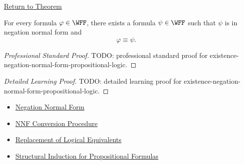 \newpage
{}
\label{prf:existence-negation-normal-form-propositional-logic}

\begin{remark*}[Return]
\hyperref[thm:existence-negation-normal-form-propositional-logic]{Return to Theorem}
\end{remark*}

\begin{theorem*}
For every formula \(\varphi\in\WFF\), there exists a formula \(\psi\in\WFF\)
such that \(\psi\) is in negation normal form and
\[
\varphi\equiv\psi.
\]
\end{theorem*}

\begin{proof}[Professional Standard Proof]
\LRAProofBodyStart
TODO: professional standard proof for existence-negation-normal-form-propositional-logic.
\end{proof}

\begin{proof}[Detailed Learning Proof]
\LRAProofBodyStart
TODO: detailed learning proof for existence-negation-normal-form-propositional-logic.
\end{proof}

\begin{remark*}
\end{remark*}

\begin{dependencies}
\begin{itemize}
  \item \hyperref[def:negation-normal-form-propositional-logic]{Negation Normal Form}
  \item \hyperref[def:nnf-conversion-procedure-propositional-logic]{NNF Conversion Procedure}
  \item \hyperref[thm:replacement-of-logical-equivalents-propositional-logic]{Replacement of Logical Equivalents}
  \item \hyperref[thm:structural-induction-propositional-formulas]{Structural Induction for Propositional Formulas}
\end{itemize}
\end{dependencies}

\clearpage
